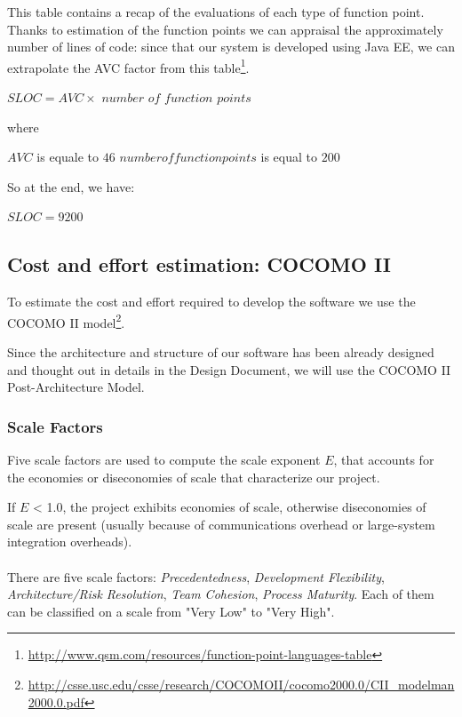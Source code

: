 \documentclass[english]{article}
\begin{document}
This table contains a recap of the evaluations of each type of function point.\\
Thanks to estimation of the function points we can appraisal the approximately number of lines of code: since that our system is developed using Java EE, we can extrapolate the AVC factor from this table\footnote{\href{http://www.qsm.com/resources/function-point-languages-table}{http://www.qsm.com/resources/function-point-languages-table}}. 

\begin{center}
$SLOC = AVC \times$ $number$ $of$ $function$ $points$
\end{center}

where

$ AVC $ is equale to $46$
$ number of function points$ is equal to $200$

So at the end, we have:

\begin{center}
$SLOC = 9200$
\end{center}


\newpage
\subsection{Cost and effort estimation: COCOMO II}

To estimate the cost and effort required to develop the software we use the COCOMO II model\footnote{\href{http://csse.usc.edu/csse/research/COCOMOII/cocomo2000.0/CII\_modelman2000.0.pdf}{http://csse.usc.edu/csse/research/COCOMOII/cocomo2000.0/CII\_modelman2000.0.pdf}}.

Since the architecture and structure of our software has been already designed and thought out in details in the Design Document, we will use the COCOMO II Post-Architecture Model.


\subsubsection{Scale Factors}

Five scale factors are used to compute the scale exponent $E$, that accounts for the economies or diseconomies of scale that characterize our project.

If $E$ < 1.0, the project exhibits economies of scale, otherwise diseconomies of scale are present (usually because of communications overhead or large-system integration overheads).

\paragraph{}
There are five scale factors: \textit{Precedentedness}, \textit{Development Flexibility}, \textit{Architecture/Risk Resolution}, \textit{Team Cohesion}, \textit{Process Maturity}. Each of them can be classified on a scale from "Very Low" to "Very High".
\end{document}
